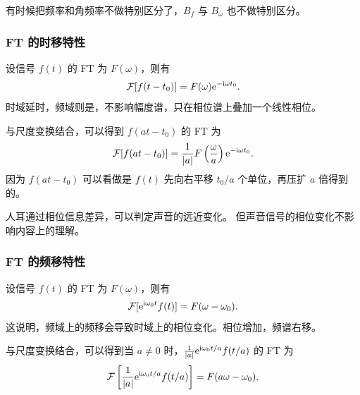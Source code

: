 \begin{note}
    有时候把频率和角频率不做特别区分了，$B_f$ 与 $B_\omega$ 也不做特别区分。
\end{note}

\subsubsection{FT 的时移特性}

\begin{property}
    设信号 $f(t)$ 的 FT 为 $F(\omega)$，则有
    \begin{align*}
        \mathcal{F}[f(t - t_0)] = F(\omega)\mathrm{e}^{-\mathrm{i}\omega t_0}.
    \end{align*}
    时域延时，频域则是，不影响幅度谱，只在相位谱上叠加一个线性相位。

    与尺度变换结合，可以得到 $f(at - t_0)$ 的 FT 为
    \begin{align*}
        \mathcal{F}[f(at - t_0)] = \frac{1}{|a|}F\left(\frac{\omega}{a}\right)\mathrm{e}^{-\mathrm{i}\omega t_0}.
    \end{align*}
    因为 $f(at - t_0)$ 可以看做是 $f(t)$ 先向右平移 $t_0 / a$ 个单位，再压扩 $a$ 倍得到的。
\end{property}

\begin{remark}
    人耳通过相位信息差异，可以判定声音的远近变化。
    但声音信号的相位变化不影响内容上的理解。
\end{remark}

\subsubsection{FT 的频移特性}

\begin{property}
    设信号 $f(t)$ 的 FT 为 $F(\omega)$，则有
    \begin{align*}
        \mathcal{F}[\mathrm{e}^{\mathrm{i}\omega_0 t}f(t)] = F(\omega - \omega_0).
    \end{align*}
    这说明，频域上的频移会导致时域上的相位变化。相位增加，频谱右移。

    与尺度变换结合，可以得到当 $a \neq 0$ 时，$\frac{1}{|a|}\mathrm{e}^{\mathrm{i}\omega_0 t/a}f(t/a)$ 的 FT 为
    \begin{align*}
        \mathcal{F}\left[\frac{1}{|a|}\mathrm{e}^{\mathrm{i}\omega_0 t/a}f(t/a)\right] = F(a\omega - \omega_0).
    \end{align*}
\end{property}


